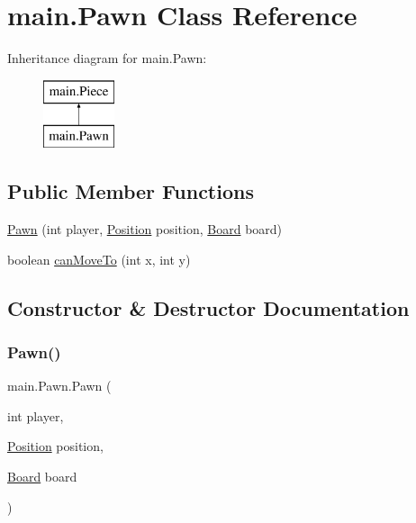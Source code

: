 \hypertarget{classmain_1_1_pawn}{}\section{main.\+Pawn Class Reference}
\label{classmain_1_1_pawn}
Inheritance diagram for main.\+Pawn\+:\begin{figure}[H]
\begin{center}
\leavevmode
\includegraphics[height=2.000000cm]{classmain_1_1_pawn}
\end{center}
\end{figure}
\subsection*{Public Member Functions}
\begin{DoxyCompactItemize}
\item 
\hyperlink{classmain_1_1_pawn_a4852bea50e9ece41201fdd0e516611b7}{Pawn} (int player, \hyperlink{classmain_1_1_position}{Position} position, \hyperlink{classmain_1_1_board}{Board} board)
\item 
boolean \hyperlink{classmain_1_1_pawn_a22a9e6be922fa7333ac79f2ab5a327b6}{can\+Move\+To} (int x, int y)
\end{DoxyCompactItemize}


\subsection{Constructor \& Destructor Documentation}
\mbox{\label{classmain_1_1_pawn_a4852bea50e9ece41201fdd0e516611b7}} 
\subsubsection{\texorpdfstring{Pawn()}{Pawn()}}
{\footnotesize\ttfamily main.\+Pawn.\+Pawn (\begin{DoxyParamCaption}\item[{int}]{player,  }\item[{\hyperlink{classmain_1_1_position}{Position}}]{position,  }\item[{\hyperlink{classmain_1_1_board}{Board}}]{board }\end{DoxyParamCaption})}

